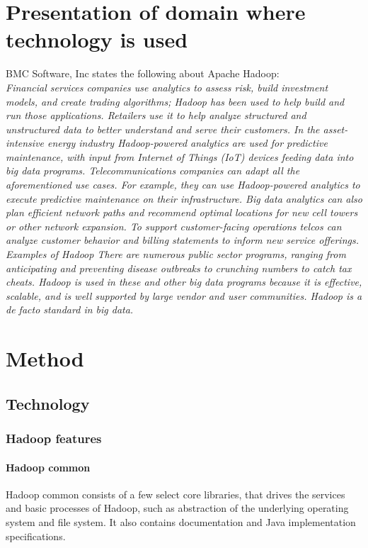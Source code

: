 \documentclass[a4paper,english]{report}
\begin{document}
	\chapter{Presentation of domain where technology is used}
		BMC Software, Inc states the following about Apache Hadoop:\\
		\emph{Financial services companies use analytics to assess risk, build investment models, and create trading algorithms; Hadoop has been used to help build and run those applications.
		Retailers use it to help analyze structured and unstructured data to better understand and serve their customers.
		In the asset-intensive energy industry Hadoop-powered analytics are used for predictive maintenance, with input from Internet of Things (IoT) devices feeding data into big data programs.
		Telecommunications companies can adapt all the aforementioned use cases. For example, they can use Hadoop-powered analytics to execute predictive maintenance on their infrastructure. Big data analytics can also plan efficient network paths and recommend optimal locations for new cell towers or other network expansion. To support customer-facing operations telcos can analyze customer behavior and billing statements to inform new service offerings. Examples of Hadoop
		There are numerous public sector programs, ranging from anticipating and preventing disease outbreaks to crunching numbers to catch tax cheats.
		Hadoop is used in these and other big data programs because it is effective, scalable, and is well supported by large vendor and user communities. Hadoop is a de facto standard in big data.}\cite{bmc}
	\chapter{Method}
		\section{Technology}
			\subsection{Hadoop features}
				\subsubsection{Hadoop common}
					Hadoop common consists of a few select core libraries, that drives the services and basic processes of Hadoop, such as abstraction of the underlying operating system and file system. It also contains documentation and Java implementation specifications. 
\end{document}
